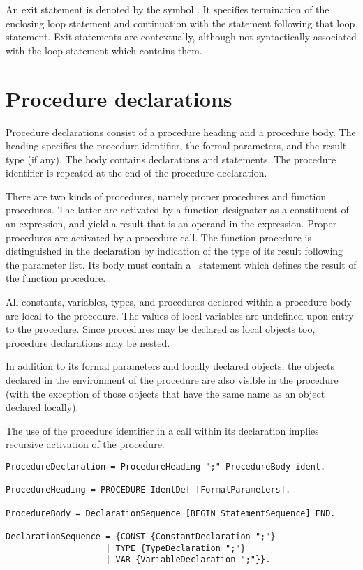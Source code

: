 \documentclass[12pt]{article}
\begin{document}
An exit statement is denoted by the symbol \EXIT. It specifies termination of the enclosing loop
statement and continuation with the statement following that loop statement. Exit statements are contextually, although not syntactically associated with the loop statement which contains them.

\section{Procedure declarations}
\label{procedures}

Procedure declarations consist of a procedure heading and a procedure body. The heading specifies the procedure identifier, the formal parameters, and the result type (if any). The body contains declarations and statements. The procedure identifier is repeated at the end of the procedure declaration.

There are two kinds of procedures, namely proper procedures and function procedures. The latter are activated by a function designator as a constituent of an expression, and yield a result that is an operand in the expression. Proper procedures are activated by a procedure call. The function procedure is distinguished in the declaration by indication of the type of its result following the parameter list. Its body must contain a \RETURN\ statement which defines the result of the function procedure.

All constants, variables, types, and procedures declared within a procedure body are local to the procedure. The values of local variables are undefined upon entry to the procedure. Since procedures may be declared as local objects too, procedure declarations may be nested.

In addition to its formal parameters and locally declared objects, the objects declared in the environment of the procedure are also visible in the procedure (with the exception of those objects that have the same name as an object declared locally).

The use of the procedure identifier in a call within its declaration implies recursive activation of the procedure.

\begin{lstlisting}[style=ebnf]
ProcedureDeclaration = ProcedureHeading ";" ProcedureBody ident. 

ProcedureHeading = PROCEDURE IdentDef [FormalParameters]. 

ProcedureBody = DeclarationSequence [BEGIN StatementSequence] END. 

DeclarationSequence = {CONST {ConstantDeclaration ";"} 
                    | TYPE {TypeDeclaration ";"} 
                    | VAR {VariableDeclaration ";"}}.
\end{lstlisting} 
\end{document}
